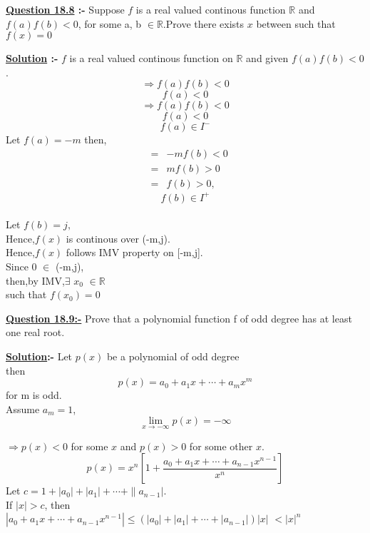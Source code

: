 \documentclass[12pt]{article}
\begin{document}
\begin{mdframed}[style=MyFrame]
 \textbf{\underline{Question 18.8} :-} Suppose $f$ is a real valued continous function $\mathbb{R}$ and \\  $f(a)f(b)<0$, for some a, b $\in \mathbb{R}$.Prove there exists $x$ between such that $f(x)=0$\\
 \end{mdframed}
 \vspace*{1cm}
 \textbf{\underline{Solution} :-}
 $f$ is a real valued continous function on $\mathbb{R}$
 and given $f(a)f(b)<0$.\\
 $$\Rightarrow f(a)f(b)<0$$
 $$f(a)<0$$
 $$\Rightarrow f(a)f(b)<0$$
 $$f(a)<0$$
 $$f(a) \in I^{-}$$
 Let $f(a)=-m$
 then,\\
 \begin{eqnarray*}
 	&=&-mf(b)<0\\
 	&=&mf(b)>0\\
 	&=&f(b)> 0,
 \end{eqnarray*}
 $$f(b) \in I^{+}$$\\
 Let $f(b) = j,$\\
 Hence,$f(x)$ is continous over (-m,j).\\
 Hence,$f(x)$ follows IMV property on [-m,j].\\
 Since 0 $\in$ (-m,j),\\
 then,by IMV,$\exists$ $x_{0}$ $\in \mathbb{R}$\\
 such that $f(x_{0})=0$\\

 
 

 \vspace{1cm}

\begin{mdframed}[style=MyFrame]
\textbf{\underline{ Question 18.9:-}} Prove that a polynomial function f of odd degree has at least one real root.\\
\end{mdframed}
\vspace*{1cm}
 \textbf{\underline{Solution}:-} Let $p(x)$ be a polynomial of odd degree\\
 then\\
 $$p(x)=a_0+a_1x+\cdots+a_mx^m$$ for m is odd.\\
 Assume $a_m=1$, \\
 $$\lim_{x\rightarrow-\infty}p(x)=-\infty$$

 $\Rightarrow  p(x)<0$ for some $x$  and $p(x)>0$ for some other $x$.
 \begin{equation}
 p(x) = x^n\left[1+\frac{a_0+a_1x+\cdots+a_{n-1}x^{n-1}}{x^n}\right]
 \end{equation}
 Let $ c=1+|a_0|+|a_1|+\cdots+\|a_{n-1}|.$\\
 If $|x|>c$, then\\
 $|a_0+a_1x+\cdots+a_{n-1}x^{n-1}|\leq\left(|a_0|+|a_1|+\cdots+|a_{n-1}|\right)|x|$
 $<|x|^n$\\
\end{document}
